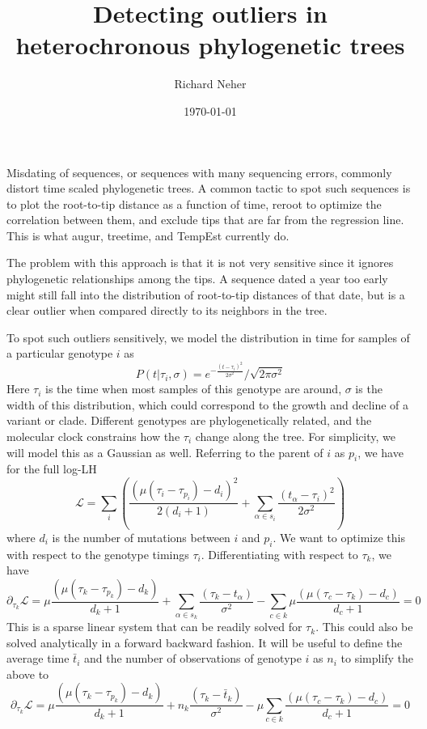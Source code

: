 \documentclass[aps,rmp, onecolumn]{revtex4}
\newcommand{\LH}{\mathcal{L}}
\begin{document}
\title{Detecting outliers in heterochronous phylogenetic trees}
\author{Richard Neher}
\date{\today}
\maketitle
Misdating of sequences, or sequences with many sequencing errors, commonly distort time scaled phylogenetic trees.
A common tactic to spot such sequences is to plot the root-to-tip distance as a function of time, reroot to optimize the correlation between them, and exclude tips that are far from the regression line.
This is what augur, treetime, and TempEst currently do.

The problem with this approach is that it is not very sensitive since it ignores phylogenetic relationships among the tips.
A sequence dated a year too early might still fall into the distribution of root-to-tip distances of that date, but is a clear outlier when compared directly to its neighbors in the tree.

To spot such outliers sensitively, we model the distribution in time for samples of a particular genotype $i$ as
\begin{equation}
    P(t|\tau_i, \sigma) = e^{-\frac{(t-\tau_i)^2}{2\sigma^2}}/\sqrt{2\pi\sigma^2}
\end{equation}
Here $\tau_i$ is the time when most samples of this genotype are around, $\sigma$ is the width of this distribution, which could correspond to the growth and decline of a variant or clade.
Different genotypes are phylogenetically related, and the molecular clock constrains how the $\tau_i$ change along the tree.
For simplicity, we will model this as a Gaussian as well.
Referring to the parent of $i$ as $p_i$, we have for the full log-LH
\begin{equation}
    \LH  = \sum_i \left(\frac{(\mu(\tau_i - \tau_{p_i}) - d_i)^2}{2(d_i+1)} + \sum_{\alpha \in s_i} \frac{(t_\alpha-\tau_i)^2}{2\sigma^2} \right)
\end{equation}
where $d_i$ is the number of mutations between $i$ and $p_i$.
We want to optimize this with respect to the genotype timings $\tau_i$.
Differentiating with respect to $\tau_k$, we have
\begin{equation}
    \partial_{\tau_k} \LH  = \mu\frac{(\mu(\tau_k - \tau_{p_k}) - d_k)}{d_k+1} + \sum_{\alpha \in s_k} \frac{(\tau_k-t_\alpha)}{\sigma^2} -  \sum_{c\in k} \mu\frac{(\mu(\tau_{c} - \tau_{k}) - d_c)}{d_c+1} = 0
\end{equation}
This is a sparse linear system that can be readily solved for $\tau_k$. This could also be solved analytically in a forward backward fashion.
It will be useful to define the average time $\bar{t}_i$ and the number of observations of genotype $i$ as $n_i$ to simplify the above to
\begin{equation}
    \partial_{\tau_k} \LH  = \mu\frac{(\mu(\tau_k - \tau_{p_k}) -  d_k)}{d_k+1} +  n_k\frac{(\tau_k-\bar{t}_k)}{\sigma^2} -  \mu\sum_{c\in k} \frac{(\mu(\tau_{c} - \tau_{k}) - d_c)}{d_c+1} = 0
\end{equation}
\end{document}
